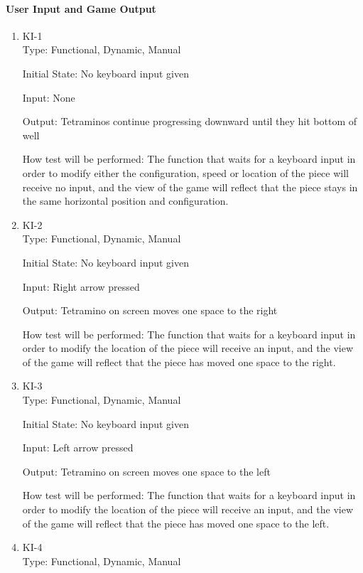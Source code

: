 \documentclass[12pt, titlepage]{article}
\begin{document}
\paragraph{User Input and Game Output}
\begin{enumerate}
\item{KI-1\\}
Type: Functional, Dynamic, Manual
					
Initial State: No keyboard input given
					
Input: None
					
Output: Tetraminos continue progressing downward until they hit bottom of well
					
How test will be performed: The function that waits for a keyboard input in order to modify either the configuration, speed or location of the piece will receive no input, and the view of the game will reflect that the piece stays in the same horizontal position and configuration.
					
\item{KI-2\\}
Type: Functional, Dynamic, Manual
					
Initial State: No keyboard input given
					
Input: Right arrow pressed
					
Output: Tetramino on screen moves one space to the right
					
How test will be performed: The function that waits for a keyboard input in order to modify the location of the piece will receive an input, and the view of the game will reflect that the piece has moved one space to the right.

\item{KI-3\\}
Type: Functional, Dynamic, Manual
					
Initial State: No keyboard input given
					
Input: Left arrow pressed
					
Output: Tetramino on screen moves one space to the left
					
How test will be performed: The function that waits for a keyboard input in order to modify the location of the piece will receive an input, and the view of the game will reflect that the piece has moved one space to the left.

\item{KI-4\\}
Type: Functional, Dynamic, Manual
					

\end{enumerate}
\end{document}

